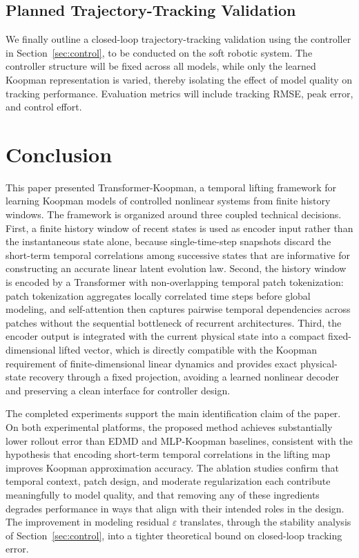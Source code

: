 \documentclass[journal]{IEEEtran}
\begin{document}
\subsection{Planned Trajectory-Tracking Validation}

We finally outline a closed-loop trajectory-tracking validation using the controller in Section~\ref{sec:control}, to be conducted on the soft robotic system. The controller structure will be fixed across all models, while only the learned Koopman representation is varied, thereby isolating the effect of model quality on tracking performance. Evaluation metrics will include tracking RMSE, peak error, and control effort.

\section{Conclusion}
\label{sec:conclusion}

This paper presented Transformer-Koopman, a temporal lifting framework for learning Koopman models of controlled nonlinear systems from finite history windows. The framework is organized around three coupled technical decisions. First, a finite history window of recent states is used as encoder input rather than the instantaneous state alone, because single-time-step snapshots discard the short-term temporal correlations among successive states that are informative for constructing an accurate linear latent evolution law. Second, the history window is encoded by a Transformer with non-overlapping temporal patch tokenization: patch tokenization aggregates locally correlated time steps before global modeling, and self-attention then captures pairwise temporal dependencies across patches without the sequential bottleneck of recurrent architectures. Third, the encoder output is integrated with the current physical state into a compact fixed-dimensional lifted vector, which is directly compatible with the Koopman requirement of finite-dimensional linear dynamics and provides exact physical-state recovery through a fixed projection, avoiding a learned nonlinear decoder and preserving a clean interface for controller design.

The completed experiments support the main identification claim of the paper. On both experimental platforms, the proposed method achieves substantially lower rollout error than EDMD and MLP-Koopman baselines, consistent with the hypothesis that encoding short-term temporal correlations in the lifting map improves Koopman approximation accuracy. The ablation studies confirm that temporal context, patch design, and moderate regularization each contribute meaningfully to model quality, and that removing any of these ingredients degrades performance in ways that align with their intended roles in the design. The improvement in modeling residual $\varepsilon$ translates, through the stability analysis of Section~\ref{sec:control}, into a tighter theoretical bound on closed-loop tracking error.
\end{document}
